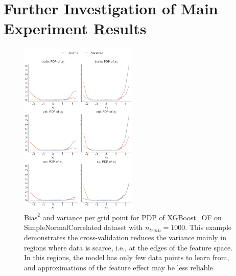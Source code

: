 \documentclass[runningheads]{llncs}
\begin{document}
\clearpage
\section{Further Investigation of Main Experiment Results}\label{app:main-study-further-investigation}

\begin{figure}
    \centering
    \includegraphics[width=0.5\textwidth]{img/further_investigation/snc_pdp_XGBoost_OF_1000.png}
    \caption{$\text{Bias}^2$ and variance per grid point for PDP of XGBoost\_OF on SimpleNormalCorrelated dataset with $n_{train} = 1000$.
        This example demonstrates the cross-validation reduces the variance mainly in regions where data is scarce, i.e.,
        at the edges of the feature space. In this regions, the model has only few data points to learn from, and approximations
        of the feature effect may be less reliable.}
    \label{fig:further-pdp-xgb-snc}  %
\end{figure}
\end{document}
